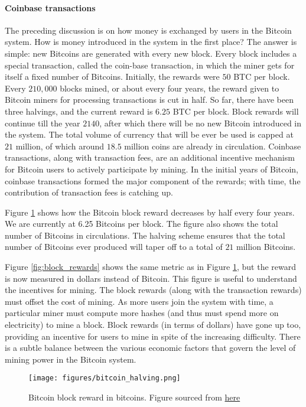 \documentclass{article}
\begin{document}
\paragraph*{Coinbase transactions}
The preceding discussion is on how money is exchanged by users in the Bitcoin system. How is money introduced in the system in the first place? The answer is simple: new Bitcoins are generated with every new block. Every block includes a special transaction, called the coin-base transaction, in which the miner gets for itself a fixed number of Bitcoins. Initially, the rewards were $50$ BTC per block. Every $210,000$ blocks mined, or about every four years, the reward given to Bitcoin miners for processing transactions is cut in half. So far, there have been three halvings, and the current reward is $6.25$ BTC per block. Block rewards will continue till the year $2140$, after which there will be no new Bitcoin introduced in the system. The total volume of currency that will be ever be used is capped at $21$ million, of which around $18.5$ million coins are already in circulation. Coinbase transactions, along with transaction fees, are an additional incentive mechanism for Bitcoin users to actively participate by mining. In the initial years of Bitcoin, coinbase transactions formed the major component of the rewards; with time, the contribution of transaction fees is catching up. 

Figure \ref{fig:bitcoin_halving} shows how the Bitcoin block reward decreases by half every four years. We are currently at 6.25 Bitcoins per block. The figure also shows the total number of Bitcoins in circulations. The halving scheme ensures that the total number of Bitcoins ever produced will taper off to a total of $21$ million Bitcoins.

Figure \ref{fig:block_rewards} shows the same metric as in Figure \ref{fig:bitcoin_halving}, but the reward is now measured in dollars instead of Bitcoin. This figure is useful to understand the incentives for mining. The block rewards (along with the transaction rewards) must offset the cost of mining. As more users join the system with time, a particular miner must compute more hashes (and thus must spend more on electricity) to mine a block. Block rewards (in terms of dollars) have gone up too, providing an incentive for users to mine in spite of the increasing difficulty. There is a subtle balance between the various economic factors that govern the level of mining power in the Bitcoin system.
\begin{figure}[p]
    \centering
    \texttt{[image: figures/bitcoin\_halving.png]}
    \caption{Bitcoin block reward in bitcoins. Figure sourced from \href{https://www.coindesk.com/bitcoin-halving-explainer}{here}}
    \label{fig:bitcoin_halving}
\end{figure}
\end{document}
